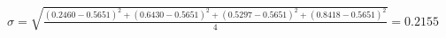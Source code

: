 \documentclass[preview]{standalone}
\begin{document}
\begin{align*}
\sigma = \sqrt{\frac{(0.2460 - 0.5651)^2 + (0.6430 - 0.5651)^2 + (0.5297 - 0.5651)^2 + (0.8418 - 0.5651)^2}{4}} = 0.2155
\end{align*}
\end{document}
